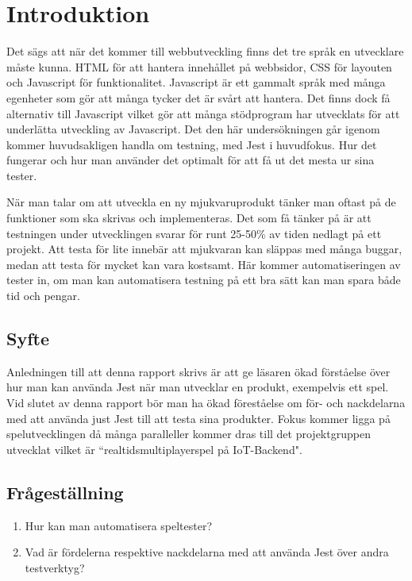 \section{Introduktion}
\label{sec:david-introduction}

Det sägs att när det kommer till webbutveckling finns det tre språk en utvecklare måste kunna. HTML för att hantera innehållet på webbsidor, CSS för layouten och Javascript för funktionalitet. Javascript är ett gammalt språk med många egenheter som gör att många tycker det är svårt att hantera. Det finns dock få alternativ till Javascript vilket gör att många stödprogram har utvecklats för att underlätta utveckling av Javascript. Det den här undersökningen går igenom kommer huvudsakligen handla om testning, med Jest\cite{bib-jest} i huvudfokus. Hur det fungerar och hur man använder det optimalt för att få ut det mesta ur sina tester.

När man talar om att utveckla en ny mjukvaruprodukt tänker man oftast på de funktioner som ska skrivas och implementeras. Det som få tänker på är att testningen under utvecklingen svarar för runt 25-50\% av tiden nedlagt på ett projekt. Att testa för lite innebär att mjukvaran kan släppas med många buggar, medan att testa för mycket kan vara kostsamt. Här kommer automatiseringen av tester in, om man kan automatisera testning på ett bra sätt kan man spara både tid och pengar.

\subsection{Syfte}
Anledningen till att denna rapport skrivs är att ge läsaren ökad förståelse över hur man kan använda Jest när man utvecklar en produkt, exempelvis ett spel. Vid slutet av denna rapport bör man ha ökad föreståelse om för- och nackdelarna med att använda just Jest till att testa sina produkter. Fokus kommer ligga på spelutvecklingen då många paralleller kommer dras till det projektgruppen utvecklat vilket är ``realtidsmultiplayerspel på IoT-Backend". 




\subsection{Frågeställning}
\label{subsec:david-research-questions}

\begin{enumerate}
\item Hur kan man automatisera speltester?
\item Vad är fördelerna respektive nackdelarna med att använda Jest över andra testverktyg?

\end{enumerate}

